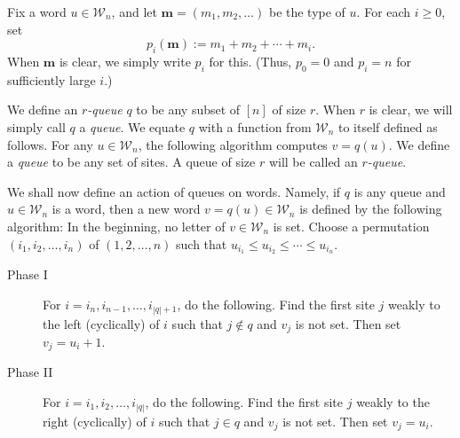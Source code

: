 \documentclass[reqno]{amsart}
\newcommand{\0}{\phantom{c}}
\newcommand{\mm}{\mathbf{m}}
\newcommand{\mcW}{\mathcal{W}}
\newenvironment{verlong}{}{}
\newenvironment{vershort}{}{}
\newcommand{\abs}[1]{\left| #1 \right|}
\newcommand{\tup}[1]{\left( #1 \right)}
\newcommand{\ive}[1]{\left[ #1 \right]}
\newcommand{\defn}[1]{{\color{darkred}\emph{#1}}} %
\theoremstyle{plain}
\theoremstyle{definition}
\numberwithin{equation}{section}
\newcommand{\travis}[1]{\todo[size=\tiny,color=blue!30]{#1 \\ \hfill --- Travis}}
\begin{document}
Fix a word $u \in \mcW_n$, and let $\mm = (m_1, m_2, \ldots)$ be the type of $u$.
For each $i \geq 0$, set
\begin{equation}
\label{eq:type_partial_sums}
p_i(\mm) := m_1 + m_2 + \cdots + m_i.
\end{equation}
When $\mm$ is clear, we simply write $p_i$ for this.
(Thus, $p_0 = 0$ and $p_i = n$ for sufficiently large $i$.)

\begin{vershort}
We define an \defn{$r$-queue} $q$ to be any subset of $\ive{n}$ of size $r$. When $r$ is clear, we will simply call $q$ a \defn{queue}.
We equate $q$ with a function from $\mcW_n$ to itself defined as follows.
For any $u \in \mcW_n$, the following algorithm computes $v = q(u)$.
\end{vershort}
\begin{verlong}
We define a \defn{queue} to be any set of sites.
A queue of size $r$ will be called an \defn{$r$-queue}.

We shall now define an action of queues on words.
Namely, if $q$ is any queue and $u \in \mcW_n$ is a word,
then a new word $v = q(u) \in \mcW_n$ is defined by the following algorithm:
\end{verlong}
In the beginning, no letter of $v \in \mcW_n$ is set.
Choose a permutation $\tup{i_1, i_2, \ldots, i_n}$ of $\tup{1, 2, \ldots, n}$
such that $u_{i_1} \leq u_{i_2} \leq \cdots \leq u_{i_n}$.

\begin{description}
\item[Phase I]
  For $i = i_n, i_{n-1}, \ldots, i_{\abs{q}+1}$, do the following.
    Find the first site $j$ weakly to the left (cyclically) of $i$ such that $j \notin q$ and $v_j$ is not set.
    Then set $v_j = u_i + 1$.

\item[Phase II]
  For $i = i_1, i_2, \ldots, i_{\abs{q}}$, do the following.
    Find the first site $j$ weakly to the right (cyclically) of $i$ such that $j \in q$ and $v_j$ is not set.
    Then set $v_j = u_i$.
\end{description}
\end{document}
